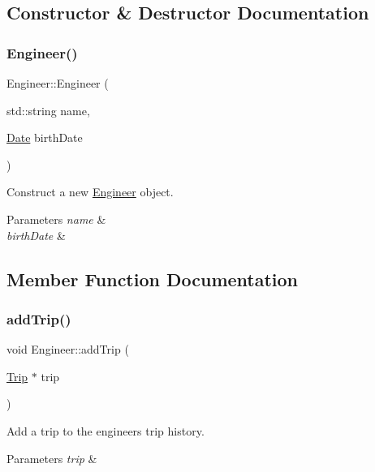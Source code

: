 \subsection{Constructor \& Destructor Documentation}
\mbox{\label{classEngineer_a608c643d1826e12d503c213679803a60}} 
\subsubsection{\texorpdfstring{Engineer()}{Engineer()}}
{\footnotesize\ttfamily Engineer\+::\+Engineer (\begin{DoxyParamCaption}\item[{std\+::string}]{name,  }\item[{\mbox{\hyperlink{classDate}{Date}}}]{birth\+Date }\end{DoxyParamCaption})}

Construct a new \mbox{\hyperlink{classEngineer}{Engineer}} object.


\begin{DoxyParams}{Parameters}
{\em name} & \\
\hline
{\em birth\+Date} & \\
\hline
\end{DoxyParams}


\subsection{Member Function Documentation}
\mbox{\label{classEngineer_a399ceec45f4608f743070893ac573dcc}} 
\subsubsection{\texorpdfstring{add\+Trip()}{addTrip()}}
{\footnotesize\ttfamily void Engineer\+::add\+Trip (\begin{DoxyParamCaption}\item[{\mbox{\hyperlink{classTrip}{Trip}} $\ast$}]{trip }\end{DoxyParamCaption})}

Add a trip to the engineer\textquotesingle{}s trip history.


\begin{DoxyParams}{Parameters}
{\em trip} & \\
\hline
\end{DoxyParams}
\mbox{\label{classEngineer_aa2a341b66e189ef19ab7dfa364cd2c20}} 
